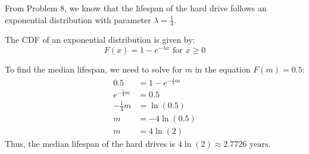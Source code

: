 \documentclass[a4paper, 10pt]{article}
\begin{document}
\begin{solution}
From Problem 8, we know that the lifespan of the hard drive follows an exponential distribution with parameter \( \lambda = \frac{1}{4} \).

\vspace{2mm}

The CDF of an exponential distribution is given by:
\[ F(x) = 1 - e^{-\lambda x} \text{ for } x \geq 0 \]

To find the median lifespan, we need to solve for \( m \) in the equation \( F(m) = 0.5 \):
\begin{align*}
    0.5 &= 1 - e^{-\frac{1}{4} m} \\
    e^{-\frac{1}{4} m} &= 0.5 \\
    -\frac{1}{4} m &= \ln(0.5) \\
    m &= -4 \ln(0.5) \\
    m &= 4 \ln(2)
\end{align*}
Thus, the median lifespan of the hard drives is \( \boxed{4 \ln(2) \approx 2.7726 \text{ years}} \).
\end{solution}

\newpage
\end{document}
